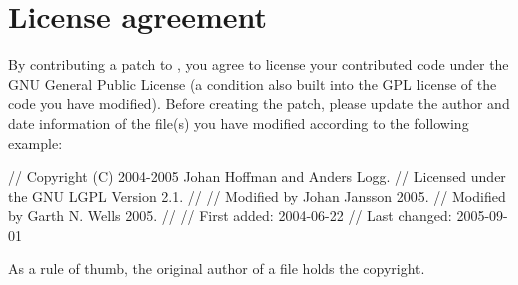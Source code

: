 
\section{License agreement}

By contributing a patch to \package{}, you agree to license your
contributed code under the GNU General Public License (a condition
also built into the GPL license of the code you have modified). Before
creating the patch, please update the author and date information of
the file(s) you have modified according to the following example:

\begin{code}
// Copyright (C) 2004-2005 Johan Hoffman and Anders Logg.
// Licensed under the GNU LGPL Version 2.1.
//
// Modified by Johan Jansson 2005.
// Modified by Garth N. Wells 2005.
//
// First added:  2004-06-22
// Last changed: 2005-09-01
\end{code}

As a rule of thumb, the original author of a file holds the copyright.
